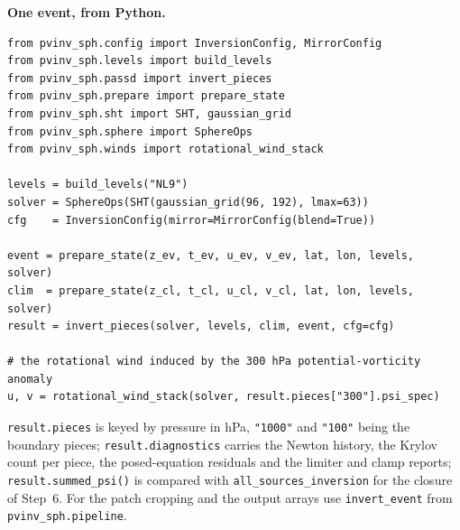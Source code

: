 \documentclass[11pt,a4paper]{article}
\newcommand{\code}[1]{\texttt{#1}}
\begin{document}
\textbf{One event, from Python.}
{\small
\begin{verbatim}
from pvinv_sph.config import InversionConfig, MirrorConfig
from pvinv_sph.levels import build_levels
from pvinv_sph.passd import invert_pieces
from pvinv_sph.prepare import prepare_state
from pvinv_sph.sht import SHT, gaussian_grid
from pvinv_sph.sphere import SphereOps
from pvinv_sph.winds import rotational_wind_stack

levels = build_levels("NL9")
solver = SphereOps(SHT(gaussian_grid(96, 192), lmax=63))
cfg    = InversionConfig(mirror=MirrorConfig(blend=True))

event = prepare_state(z_ev, t_ev, u_ev, v_ev, lat, lon, levels, solver)
clim  = prepare_state(z_cl, t_cl, u_cl, v_cl, lat, lon, levels, solver)
result = invert_pieces(solver, levels, clim, event, cfg=cfg)

# the rotational wind induced by the 300 hPa potential-vorticity anomaly
u, v = rotational_wind_stack(solver, result.pieces["300"].psi_spec)
\end{verbatim}
}
\code{result.pieces} is keyed by pressure in hPa, \code{"1000"} and
\code{"100"} being the boundary pieces; \code{result.diagnostics} carries the
Newton history, the Krylov count per piece, the posed-equation residuals and
the limiter and clamp reports; \code{result.summed\_psi()} is compared with
\code{all\_sources\_inversion} for the closure of Step~6. For the patch
cropping and the output arrays use \code{invert\_event} from
\code{pvinv\_sph.pipeline}.
\end{document}
